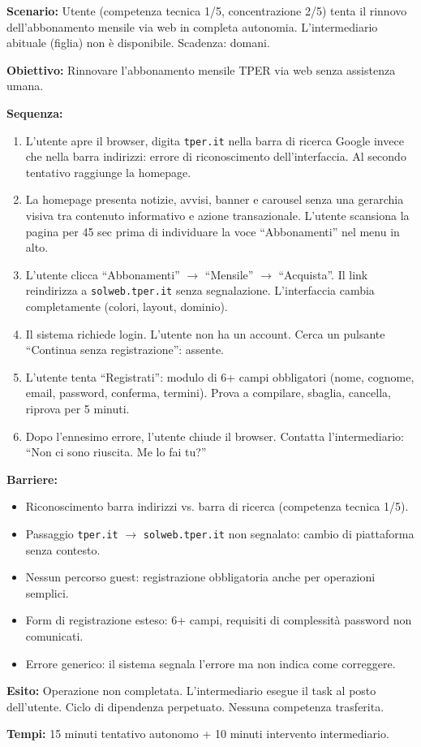 ﻿\documentclass[11pt,a4paper]{article}
\begin{document}
\begin{tcolorbox}[base]
    {\small
    \textbf{Scenario:} Utente (competenza tecnica 1/5, concentrazione 2/5) tenta il rinnovo dell'abbonamento mensile via web in completa autonomia. L'intermediario abituale (figlia) non è disponibile. Scadenza: domani.

    \textbf{Obiettivo:} Rinnovare l'abbonamento mensile TPER via web senza assistenza umana.

    \textbf{Sequenza:}
    \begin{enumerate}
        \item L'utente apre il browser, digita \texttt{tper.it} nella barra di ricerca Google invece che nella barra indirizzi: errore di riconoscimento dell'interfaccia. Al secondo tentativo raggiunge la homepage.
        \item La homepage presenta notizie, avvisi, banner e carousel senza una gerarchia visiva tra contenuto informativo e azione transazionale. L'utente scansiona la pagina per 45 sec prima di individuare la voce ``Abbonamenti'' nel menu in alto.
        \item L'utente clicca ``Abbonamenti'' $\rightarrow$ ``Mensile'' $\rightarrow$ ``Acquista''. Il link reindirizza a \texttt{solweb.tper.it} senza segnalazione. L'interfaccia cambia completamente (colori, layout, dominio).
        \item Il sistema richiede login. L'utente non ha un account. Cerca un pulsante ``Continua senza registrazione'': assente.
        \item L'utente tenta ``Registrati'': modulo di 6+ campi obbligatori (nome, cognome, email, password, conferma, termini). Prova a compilare, sbaglia, cancella, riprova per 5 minuti.
        \item Dopo l'ennesimo errore, l'utente chiude il browser. Contatta l'intermediario: ``Non ci sono riuscita. Me lo fai tu?''
    \end{enumerate}

    \textbf{Barriere:}
    \begin{itemize}
        \item Riconoscimento barra indirizzi vs. barra di ricerca (competenza tecnica 1/5).
        \item Passaggio \texttt{tper.it} $\rightarrow$ \texttt{solweb.tper.it} non segnalato: cambio di piattaforma senza contesto.
        \item Nessun percorso guest: registrazione obbligatoria anche per operazioni semplici.
        \item Form di registrazione esteso: 6+ campi, requisiti di complessità password non comunicati.
        \item Errore generico: il sistema segnala l'errore ma non indica come correggere.
    \end{itemize}

    \textbf{Esito:} Operazione non completata. L'intermediario esegue il task al posto dell'utente. Ciclo di dipendenza perpetuato. Nessuna competenza trasferita.

    \textbf{Tempi:} 15 minuti tentativo autonomo + 10 minuti intervento intermediario.
    }
\end{tcolorbox}
\end{document}
